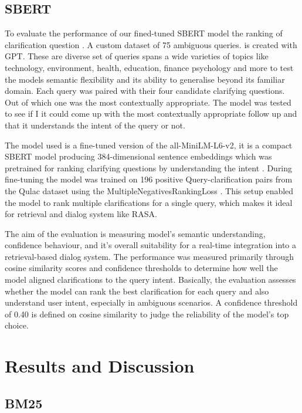 \documentclass[11pt]{article}
\begin{document}
\subsection{SBERT}
To evaluate the performance of our fined-tuned SBERT model the ranking of clarification question \cite{Tomaarsen2025b}. A custom dataset of 75 ambiguous queries.  is created with GPT. These are diverse set of queries spans a wide varieties of topics like technology, environment, health, education, finance psychology and more to test the models semantic flexibility and its ability to generalise beyond its familiar domain. Each query was paired with their four candidate clarifying questions. Out of which one was the most contextually appropriate.  The model was tested to see if I it could come up with the most contextually appropriate follow up and that it understands the intent of the query or not. 

The model used is a fine-tuned version of the all-MiniLM-L6-v2, it is a compact SBERT model producing 384-dimensional sentence embeddings which was pretrained for ranking clarifying questions by understanding the intent \cite{Tomaarsen2025a}. During fine-tuning the model was trained on 196 positive Query-clarification pairs from the Qulac dataset using the MultipleNegativesRankingLoss \cite{Tomaarsen2025c}. This setup enabled the model to rank multiple clarifications for a single query, which makes it ideal for retrieval and dialog system like RASA. 

The aim of the evaluation is measuring model's semantic understanding, confidence behaviour, and it's overall suitability for a real-time integration into a retrieval-based dialog system. The performance was measured primarily through cosine similarity scores and confidence thresholds to determine how well the model aligned clarifications to the query intent.
Basically, the evaluation assesses whether the model can rank the best clarification for each query and also understand user intent, especially in ambiguous scenarios. A confidence threshold of 0.40 is defined on cosine similarity to judge the reliability of the model's top choice.


\section{Results and Discussion}
\subsection{BM25}
\end{document}
